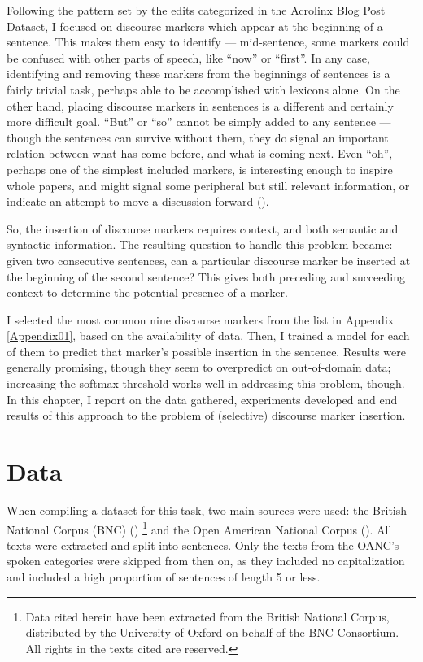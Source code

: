 Following the pattern set by the edits categorized in the Acrolinx Blog Post Dataset, I focused on discourse markers which appear at the beginning of a sentence. This makes them easy to identify --- mid-sentence, some markers could be confused with other parts of speech, like ``now'' or ``first''. In any case, identifying and removing these markers from the beginnings of sentences is a fairly trivial task, perhaps able to be accomplished with lexicons alone. On the other hand, placing discourse markers in sentences is a different and certainly more difficult goal. ``But'' or ``so'' cannot be simply added to any sentence --- though the sentences can survive without them, they do signal an important relation between what has come before, and what is coming next. Even ``oh'', perhaps one of the simplest included markers, is interesting enough to inspire whole papers, and might signal some peripheral but still relevant information, or indicate an attempt to move a discussion forward (\cite{bolden2006oh}).

So, the insertion of discourse markers requires context, and both semantic and syntactic information. The resulting question to handle this problem became: given two consecutive sentences, can a particular discourse marker be inserted at the beginning of the second sentence? This gives both preceding and succeeding context to determine the potential presence of a marker.

I selected the most common nine discourse markers from the list in Appendix \ref{Appendix01}, based on the availability of data. Then, I trained a model for each of them to predict that marker's possible insertion in the sentence. Results were generally promising, though they seem to overpredict on out-of-domain data; increasing the softmax threshold works well in addressing this problem, though. In this chapter, I report on the data gathered, experiments developed and end results of this approach to the problem of (selective) discourse marker insertion.

\section{Data}

When compiling a dataset for this task, two main sources were used: the British National Corpus (BNC) (\cite{bnc}) \footnote{Data cited herein have been extracted from the British National Corpus, distributed by the University of Oxford on behalf of the BNC Consortium. All rights in the texts cited are reserved.} and the Open American National Corpus (\cite{ide2001oanc}). All texts were extracted and split into sentences. Only the texts from the OANC's spoken categories were skipped from then on, as they included no capitalization and included a high proportion of sentences of length 5 or less. 

